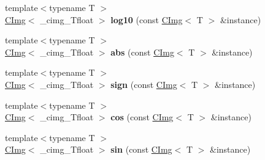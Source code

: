 \begin{DoxyCompactItemize}
\item 
\mbox{\label{namespacecimg__library__suffixed_a0f2193937084db25a38b70eab00da3dd}} 
{\footnotesize template$<$typename T $>$ }\\\hyperlink{structcimg__library__suffixed_1_1CImg}{C\+Img}$<$ \+\_\+cimg\+\_\+\+Tfloat $>$ {\bfseries log10} (const \hyperlink{structcimg__library__suffixed_1_1CImg}{C\+Img}$<$ T $>$ \&instance)
\item 
\mbox{\label{namespacecimg__library__suffixed_a460d44242e85724aa80e7e4135a01373}} 
{\footnotesize template$<$typename T $>$ }\\\hyperlink{structcimg__library__suffixed_1_1CImg}{C\+Img}$<$ \+\_\+cimg\+\_\+\+Tfloat $>$ {\bfseries abs} (const \hyperlink{structcimg__library__suffixed_1_1CImg}{C\+Img}$<$ T $>$ \&instance)
\item 
\mbox{\label{namespacecimg__library__suffixed_a6c1da7d235c362b64a21b2da2a425875}} 
{\footnotesize template$<$typename T $>$ }\\\hyperlink{structcimg__library__suffixed_1_1CImg}{C\+Img}$<$ \+\_\+cimg\+\_\+\+Tfloat $>$ {\bfseries sign} (const \hyperlink{structcimg__library__suffixed_1_1CImg}{C\+Img}$<$ T $>$ \&instance)
\item 
\mbox{\label{namespacecimg__library__suffixed_a758afc88f8b8d378717648ba797aee12}} 
{\footnotesize template$<$typename T $>$ }\\\hyperlink{structcimg__library__suffixed_1_1CImg}{C\+Img}$<$ \+\_\+cimg\+\_\+\+Tfloat $>$ {\bfseries cos} (const \hyperlink{structcimg__library__suffixed_1_1CImg}{C\+Img}$<$ T $>$ \&instance)
\item 
\mbox{\label{namespacecimg__library__suffixed_adadd90e3f405e206a38d01dc80e9be2d}} 
{\footnotesize template$<$typename T $>$ }\\\hyperlink{structcimg__library__suffixed_1_1CImg}{C\+Img}$<$ \+\_\+cimg\+\_\+\+Tfloat $>$ {\bfseries sin} (const \hyperlink{structcimg__library__suffixed_1_1CImg}{C\+Img}$<$ T $>$ \&instance)
\item 
\mbox{\label{namespacecimg__library__suffixed_abe9c92eb888fb9765f8535602dc42b34}} 

\end{DoxyCompactItemize}
